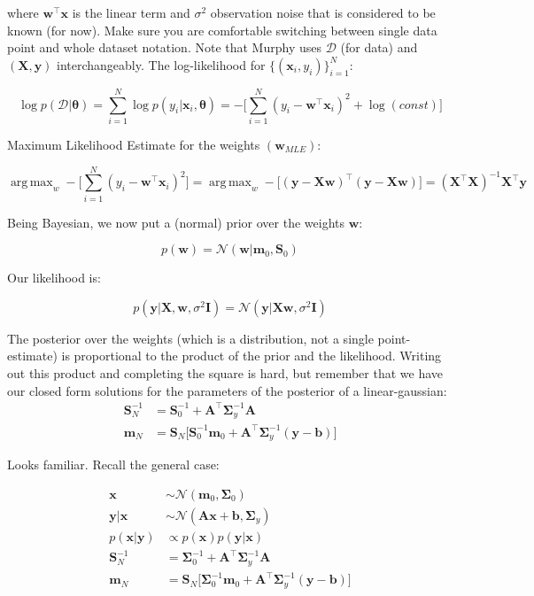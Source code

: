 \documentclass{harvardml}
\theoremstyle{definition}
\theoremstyle{plain}
\DeclareMathOperator*{\argmax}{arg\,max}
\renewcommand{\v}[1]{\mathbf{#1}}
\begin{document}
\noindent where $\v w^\top \v x$ is the linear term and 
$\sigma^2$ observation noise that is considered to be known (for now).
Make sure you are comfortable switching between single data point
and whole dataset notation. Note that Murphy uses $\mathcal{D}$
(for data) and $(\v X, \v y)$ interchangeably. The log-likelihood
for $\{(\v x_i,y_i)\}_{i=1}^N$:

$$  \log p (\mathcal{D} | \v \theta) = 
    \sum_{i=1}^N \log p (y_i | \v x_i, \v \theta) = 
    -\big[\sum_{i=1}^N (y_i - \v w^\top \v x_i)^2 + \log(const) \big]
$$

\noindent Maximum Likelihood Estimate for the weights $(\v w_{MLE})$:

$$
    \argmax_w -\big[\sum_{i=1}^N (y_i - \v w^\top \v x_i)^2\big] = 
    \argmax_w -\big[(\v y - \v X \v w)^\top(\v y - \v X \v w)\big] =
    (\v X^\top \v X)^{-1}\v X^\top \v y
$$

\noindent Being Bayesian, we now put a (normal) prior over the weights $\v w$:

$$ p(\v w) = \mathcal{N}(\v w | \v m_0, \v S_0)$$

\noindent Our likelihood is:

$$ p(\v y| \v X, \v w, \sigma^2 \v I) = 
\mathcal{N}(\v y | \v X \v w, \sigma^2 \v I)$$

\noindent The posterior over the weights (which is a distribution, 
not a single point-estimate) is proportional to the product of the 
prior and the likelihood. Writing out this product and completing the square is hard, but remember that we have our closed form solutions for the parameters
of the posterior of a linear-gaussian:
\begin{align*}
    \v S_N^{-1} &= \v S_0^{-1} + \v A^\top \v \Sigma_y^{-1} \v A \\
    \v m_N &= \v S_N\big[\v S_0^{-1} \v m_0 + 
    \v A^\top \v \Sigma_y^{-1} (\v y - \v b) \big]
\end{align*}

\noindent Looks familiar. Recall the general case:

\begin{align*}
    \v x &\sim \mathcal{N}(\v m_0, \v \Sigma_0) \\
    \v y | \v x &\sim \mathcal{N}(\v A \v x + \v b, \v \Sigma_y) \\
    p(\v x | \v y) &\propto p(\v x)p(\v y | \v x) \\
    \v S_N^{-1} &= 
    \v \Sigma_0^{-1} + \v A^\top \v \Sigma_{y}^{-1} \v A \\
    \v m_N &=
    \v S_N \big[\v \Sigma_0^{-1} \v m_0 +
    \v A^\top \v \Sigma_{y}^{-1}(\v y - \v b)\big]
\end{align*}
\end{document}
